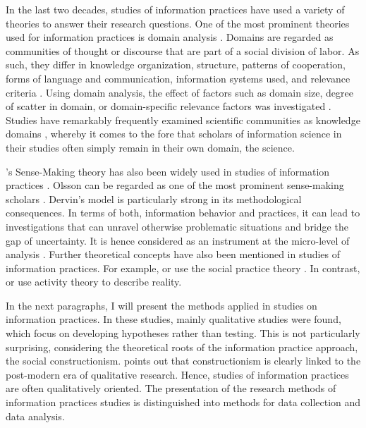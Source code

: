 \documentclass[12pt, a4paper, titlepage, oneside, abstract=true, toc=listof, toc=bibliography, BCOR=1cm]{scrreprt}
\begin{document}
In the last two decades, studies of information practices have used a variety of theories to answer their research questions. 
One of the most prominent theories used for information practices is domain analysis \citep{Hjorland1995, Hjorland2002, Palmer1999}. Domains are regarded as communities of thought or discourse that are part of a social division of labor. As such, they differ in knowledge organization, structure, patterns of cooperation, forms of language and communication, information systems used, and relevance criteria \citep{Hjorland1995}. Using domain analysis, the effect of factors such as domain size, degree of scatter in domain, or domain-specific relevance factors was investigated \citep{Talja2003}. Studies have remarkably frequently examined scientific communities as knowledge domains \citep{AhenkorahMarfo2016, Benardou2013, Christensen2014, Fry2006, Talja2003}, whereby it comes to the fore that scholars of information science in their studies often simply remain in their own domain, the science.
 
\citet{Dervin1983, Dervin2015}'s Sense-Making theory has also been widely used in studies of information practices \citep[e.g.][]{Atmore2017, Folb2010, Li2016, Olsson2010, Olsson2016}. Olsson can be regarded as one of the most prominent sense-making scholars \citep{Lloyd2019, Olsson2010, Olsson2016}. Dervin's model is particularly strong in its methodological consequences. In terms of both, information behavior and practices, it can lead to investigations that can unravel otherwise problematic situations and bridge the gap of uncertainty. It is hence considered as an instrument at the micro-level of analysis \citep[p. 253]{Wilson1999}.
Further theoretical concepts have also been mentioned in studies of information practices. For example, \citet{Veinot2007} or \citet{Bonner2011} use the social practice theory \citep{Reckwitz2002}. In contrast, \citet{Roos2015} or \citet{Mishra2011} use activity theory to describe reality. 
 
In the next paragraphs, I will present the methods applied in studies on information practices. In these studies, mainly qualitative studies were found, which focus on developing hypotheses rather than testing. This is not particularly surprising, considering the theoretical roots of the information practice approach, the social constructionism. \citet{Walker2015} points out that constructionism is clearly linked to the post-modern era of qualitative research. Hence, studies of information practices are often qualitatively oriented. The presentation of the research methods of information practices studies is distinguished into methods for data collection and data analysis. 
\end{document}
